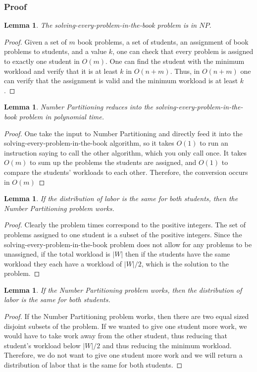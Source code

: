 \documentclass{article}
\newtheorem{lemma}[theorem]{Lemma}
\begin{document}
\subsubsection{Proof}
\begin{lemma}
The solving-every-problem-in-the-book problem is in $NP$.
\end{lemma}
\begin{proof}
Given a set of $m$ book problems, a set of students, an assignment of book problems to students, and a value $k$, one can check that every problem is assigned to exactly one student in $O(m)$. One can find the student with the minimum workload and verify that it is at least $k$ in $O(n+m)$. Thus, in $O(n+m)$ one can verify that the assignment is valid and the minimum workload is at least $k$.
\end{proof}

\begin{lemma}
Number Partitioning reduces into the solving-every-problem-in-the-book problem in polynomial time.
\end{lemma}
\begin{proof}
One take the input to Number Partitioning and directly feed it into the solving-every-problem-in-the-book algorithm, so it takes $O(1)$ to run an instruction saying to call the other algorithm, which you only call once. It takes $O(m)$ to sum up the problems the students are assigned, and $O(1)$ to compare the students' workloads to each other. Therefore, the conversion occurs in $O(m)$
\end{proof}

\begin{lemma}
If the distribution of labor is the same for both students, then the Number Partitioning problem works.
\end{lemma}
\begin{proof}
Clearly the problem times correspond to the positive integers. The set of problems assigned to one student is a subset of the positive integers. Since the solving-every-problem-in-the-book problem does not allow for any problems to be unassigned, if the total workload is $|W|$ then if the students have the same workload they each have a workload of $|W|/2$, which is the solution to the problem.
\end{proof}

\begin{lemma}
If the Number Partitioning problem works, then the distribution of labor is the same for both students.
\end{lemma}
\begin{proof}
If the Number Partitioning problem works, then there are two equal sized disjoint subsets of the problem. If we wanted to give one student more work, we would have to take work away from the other student, thus reducing that student's workload below $|W|/2$ and thus reducing the minimum workload. Therefore, we do not want to give one student more work and we will return a distribution of labor that is the same for both students.
\end{proof}
\end{document}
